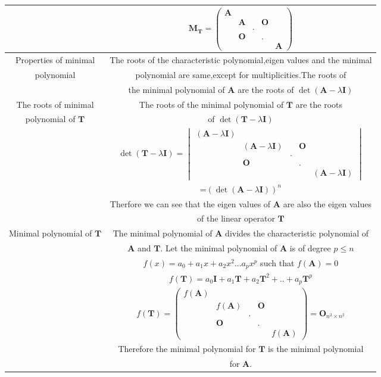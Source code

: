 \documentclass[journal,12pt,twocolumn]{IEEEtran}
\providecommand{\brak}[1]{\ensuremath{\left(#1\right)}}
\newcommand{\myvec}[1]{\ensuremath{\begin{pmatrix}#1\end{pmatrix}}}
\newcommand{\mydet}[1]{\ensuremath{\begin{vmatrix}#1\end{vmatrix}}}
\numberwithin{equation}{subsection}
\let\vec\mathbf
\begin{document}
\begin{table}[h]
    \centering
    \begin{tabular}{|c|c|}
    \hline
         & $\vec{M_T}=\myvec{\vec{A}&&&&\\&\vec{A}&&\vec{O}&\\&&.&&\\&\vec{O}&&.&\\&&&&\vec{A}}$\\
    \hline
        Properties of minimal & The roots of the characteristic polynomial,eigen values and the minimal  \\
        polynomial &polynomial are same,except for multiplicities.The roots of\\
        & the minimal polynomial of $\vec{A}$ are the roots of $\det\brak{\vec{A}-\lambda\vec{I}}$\\
    \hline
        The roots of minimal & The roots of the minimal polynomial of $\vec{T}$ are the roots\\
        polynomial of $\vec{T}$& of $\det \brak{\vec{T}-\lambda\vec{I}}$\\
        &$\det \brak{\vec{T}-\lambda\vec{I}}=\mydet{\brak{\vec{A}-\lambda\vec{I}}&&&&\\&\brak{\vec{A}-\lambda\vec{I}}&&\vec{O}&\\&&.&&\\&\vec{O}&&.&\\&&&&\brak{\vec{A}-\lambda\vec{I}}}$\\
        &=$\brak{\det \brak{\vec{A}-\lambda\vec{I}}}^{n}$\\
        & Therfore we can see that the eigen values of $\vec{A}$ are also the eigen values \\
        &of the linear operator $\vec{T}$\\
    \hline
        Minimal polynomial of $\vec{T}$ & The minimal polynomial of $\vec{A}$ divides the characteristic polynomial of \\
        &$\vec{A}$ and $\vec{T}$. Let the minimal polynomial of $\vec{A}$ is of degree $p\leq n$\\
        & $f\brak{x}=a_0+a_1x+a_2x^2...a_px^p$ such that $f\brak{\vec{A}}=0$\\
        &$f\brak{\vec{T}}=a_0\vec{I}+a_1\vec{T}+a_2\vec{T}^2+..+a_p\vec{T}^p$\\
        &$f\brak{\vec{T}}=\myvec{f\brak{\vec{A}}&&&&\\&f\brak{\vec{A}}&&\vec{O}&\\&&.&&\\&\vec{O}&&.&\\&&&&f\brak{\vec{A}}}=\vec{O}_{n^2\times n^2}$\\
        &Therefore the minimal polynomial for $\vec{T}$ is the minimal polynomial\\
        & for $\vec{A}$.\\
    \hline
    \end{tabular}
\end{table}
\end{document}
